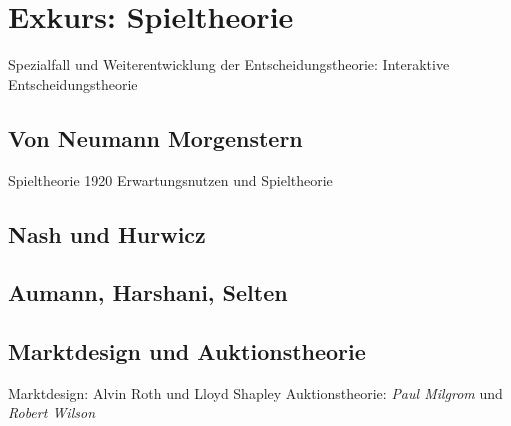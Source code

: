 %
%
%

\chapter{Exkurs: Spieltheorie} \label{cha: Spieltheorie}
\label{Spieltheorie}

Spezialfall und Weiterentwicklung der Entscheidungstheorie: Interaktive Entscheidungstheorie


\section{Von Neumann Morgenstern}
Spieltheorie 1920
Erwartungsnutzen und Spieltheorie


\section{Nash und Hurwicz}

\section{Aumann, Harshani, Selten}

\section{Marktdesign und Auktionstheorie}

Marktdesign: Alvin Roth und Lloyd Shapley 
Auktionstheorie: \textit{Paul Milgrom} und \textit{Robert Wilson}




